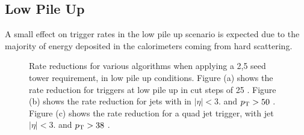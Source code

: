 \subsection{Low Pile Up} %
\label{sub:Low Pile Up}
A small effect on trigger rates in the low pile up scenario is expected due to 
the majority of energy deposited in the calorimeters coming from hard 
scattering.
\begin{figure}[h!]
    \centering
     \newline
    \caption{Rate reductions for various \Lone algorithms when applying a 2,5 \GeV seed tower requirement, in low pile up
     conditions. Figure (a) shows the rate reduction for \HT triggers at low pile up in cut steps of 25 \GeV. Figure (b) shows the 
     rate reduction for jets with in $|\eta| <3.$ and $p_{\mathrm{T}} > 50$ \GeV. Figure (c) shows the rate reduction for a quad jet trigger,
     with jet $|\eta| <3.$ and $p_{\mathrm{T}} > 38$ \GeV.}
    
    \label{fig:lowpuratereduction}
\end{figure}


